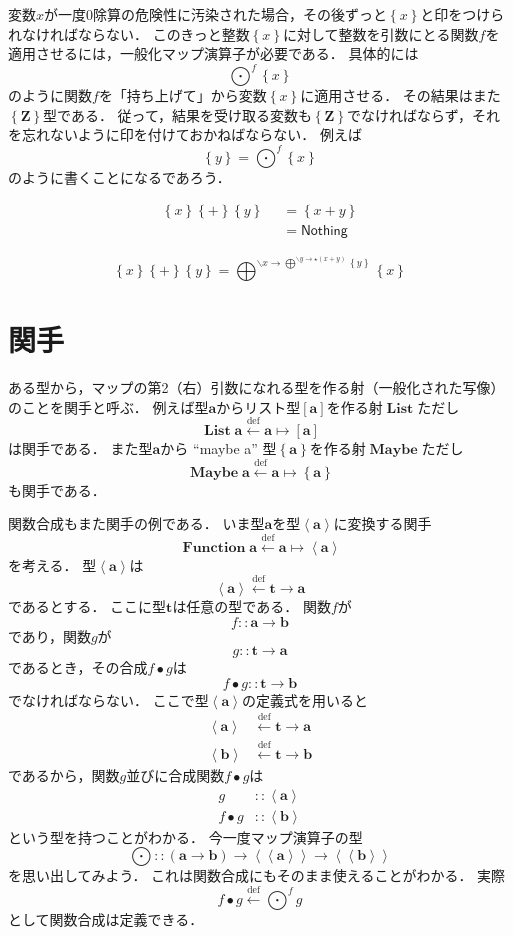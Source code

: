 \documentclass[twocolumn]{jsbook}
\newcommand{\comp}{\bullet} %
\newcommand{\defeq}{\xleftarrow{\text{def}}}
\newcommand{\guard}[1]{\mathop{\mid_{{#1}}}}
\newcommand{\haskelllambda}{\backslash}
\newcommand{\mapfunc}{\bigodot} %
\newcommand{\monadfunc}{\bigoplus}
\newcommand{\unit}{\star} %
\newcommand{\typename}[1]{\bm{#1}}
\newcommand{\integertype}{\typename{Z}}
\newcommand{\function}[1]{\left\langle#1\right\rangle}
\newcommand{\generalcontainer}[1]{\left\langle\!\left\langle#1\right\rangle\!\right\rangle}
\newcommand{\listtype}[1]{\left[#1\right]}
\newcommand{\maybe}[1]{\left\{#1\right\}}
\newcommand{\functor}[1]{\mathop{\textbf{#1}}}
\newcommand{\functionfunctor}{\mathop{\functor{Function}}}
\newcommand{\listfunctor}{\mathop{\functor{List}}}
\newcommand{\maybefunctor}{\mathop{\functor{Maybe}}}
\newcommand{\haskellkeyword}[1]{\textbf{#1}}
\newcommand{\otherwise}{\haskellkeyword{otherwise}}
\newcommand{\specialkeyword}[1]{\textsf{#1}}
\newcommand{\nothing}{\specialkeyword{Nothing}}
\begin{document}
変数$x$が一度$0$除算の危険性に汚染された場合，その後ずっと$\maybe{x}$と印をつけられなければならない．
このきっと整数$\maybe{x}$に対して整数を引数にとる関数$f$を適用させるには，一般化マップ演算子が必要である．
具体的には$$\mapfunc^f\maybe{x}$$のように関数$f$を「持ち上げて」から変数$\maybe{x}$に適用させる．
その結果はまた$\maybe{\integertype}$型である．
従って，結果を受け取る変数も$\maybe{\integertype}$でなければならず，それを忘れないように印を付けておかねばならない．
例えば$$\maybe{y}=\mapfunc^f\maybe{x}$$のように書くことになるであろう．

\begin{align*}
\maybe{x}\maybe{+}\maybe{y}&\guard{\maybe{x}\neq\nothing\wedge\maybe{y}\neq\nothing}=\maybe{x+y}\\
&\guard{\otherwise}=\nothing
\end{align*}

$$\maybe{x}\maybe{+}\maybe{y}=\monadfunc^{\haskelllambda x\rightarrow\monadfunc^{\haskelllambda y\rightarrow\unit(x+y)}\maybe{y}}\maybe{x}$$


\section{関手}

ある型から，マップの第2（右）引数になれる型を作る射（一般化された写像）のことを関手と呼ぶ．
例えば型$\typename{a}$からリスト型$[\typename{a}]$を作る射$\listfunctor$ただし$$\listfunctor\typename{a}\defeq\typename{a}\mapsto\listtype{\typename{a}}$$は関手である．
また型$\typename{a}$から ``maybe a'' 型$\maybe{\typename{a}}$を作る射$\maybefunctor$ただし$$\maybefunctor\typename{a}\defeq\typename{a}\mapsto\maybe{\typename{a}}$$も関手である．

関数合成もまた関手の例である．
いま型$\typename{a}$を型$\function{\typename{a}}$に変換する関手$$\functionfunctor\typename{a}\defeq\typename{a}\mapsto\function{\typename{a}}$$を考える．
型$\function{\typename{a}}$は$$\function{\typename{a}}\defeq\typename{t}\rightarrow\typename{a}$$であるとする．
ここに型$\typename{t}$は任意の型である．
関数$f$が$$f::\typename{a}\rightarrow\typename{b}$$であり，関数$g$が$$g::\typename{t}\rightarrow\typename{a}$$であるとき，その合成$f\comp g$は$$f\comp g::\typename{t}\rightarrow\typename{b}$$でなければならない．
ここで型$\function{\typename{a}}$の定義式を用いると
\begin{align*}
\function{\typename{a}}&\defeq\typename{t}\rightarrow\typename{a}\\
\function{\typename{b}}&\defeq\typename{t}\rightarrow\typename{b}
\end{align*}
であるから，関数$g$並びに合成関数$f\comp g$は
\begin{align*}
g&::\function{\typename{a}}\\
f\comp g&::\function{\typename{b}}
\end{align*}
という型を持つことがわかる．
今一度マップ演算子の型$$\mapfunc::(\typename{a}\rightarrow\typename{b})\rightarrow\generalcontainer{\typename{a}}\rightarrow\generalcontainer{\typename{b}}$$を思い出してみよう．
これは関数合成にもそのまま使えることがわかる．
実際$$f\comp g\defeq\mapfunc^fg$$として関数合成は定義できる．
\end{document}
